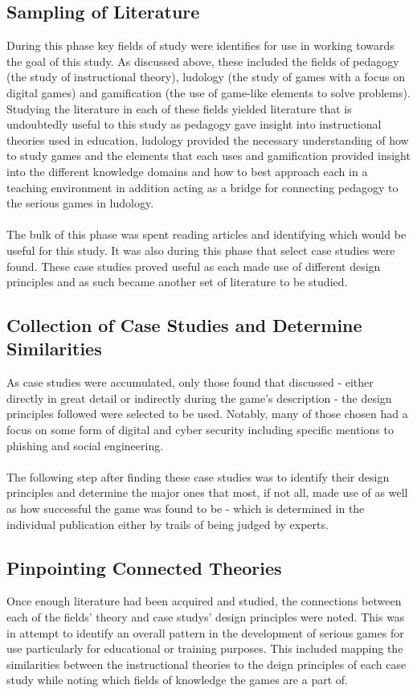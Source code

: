 \documentclass[conference]{IEEEtran}
\begin{document}
\subsection{Sampling of Literature}
During this phase key fields of study were identifies for use in working towards the goal of this study. As discussed above, these included the fields of pedagogy (the study of instructional theory), ludology (the study of games with a focus on digital games) and gamification (the use of game-like elements to solve problems). Studying the literature in each of these fields yielded literature that is undoubtedly useful to this study as pedagogy gave insight into instructional theories used in education, ludology provided the necessary understanding of how to study games and the elements that each uses and gamification provided insight into the different knowledge domains and how to best approach each in a teaching environment in addition acting as a bridge for connecting pedagogy to the serious games in ludology. 
\\\\
The bulk of this phase was spent reading articles and identifying which would be useful for this study. It was also during this phase that select case studies were found. These case studies proved useful as each made use of different design principles and as such became another set of literature to be studied.

\subsection{Collection of Case Studies and Determine Similarities}
As case studies were accumulated, only those found that discussed - either directly in great detail or indirectly during the game's description - the design principles followed were selected to be used. Notably, many of those chosen had a focus on some form of digital and cyber security including specific mentions to phishing and social engineering\cite{Sheng2007, Dincelli2020}. 
\\\\
The following step after finding these case studies was to identify their design principles and determine the major ones that most, if not all, made use of as well as how successful the game was found to be - which is determined in the individual publication either by trails of being judged by experts.

\subsection{Pinpointing Connected Theories}
Once enough literature had been acquired and studied, the connections between each of the fields' theory and case studys' design principles were noted. This was in attempt to identify an overall pattern in the development of serious games for use particularly for educational or training purposes. This included mapping the similarities between the instructional theories to the deign principles of each case study while noting which fields of knowledge the games are a part of.  
\end{document}
